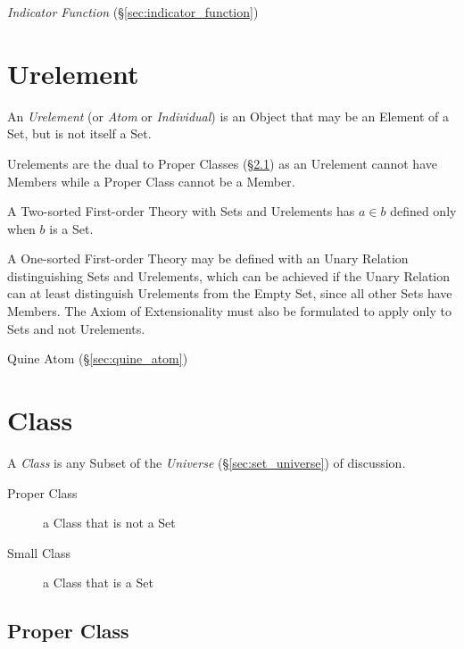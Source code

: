 \emph{Indicator Function} (\S\ref{sec:indicator_function})



\section{Urelement}\label{sec:urelement}

An \emph{Urelement} (or \emph{Atom} or \emph{Individual}) is an Object
that may be an Element of a Set, but is not itself a Set.

Urelements are the dual to Proper Classes (\S\ref{sec:proper_class})
as an Urelement cannot have Members while a Proper Class cannot be a
Member.

A Two-sorted First-order Theory with Sets and Urelements has $a \in b$
defined only when $b$ is a Set.

A One-sorted First-order Theory may be defined with an Unary Relation
distinguishing Sets and Urelements, which can be achieved if the Unary
Relation can at least distinguish Urelements from the Empty Set, since
all other Sets have Members. The Axiom of Extensionality must also be
formulated to apply only to Sets and not Urelements.

Quine Atom (\S\ref{sec:quine_atom})



\section{Class}\label{sec:class}

A \emph{Class} is any Subset of the \emph{Universe}
(\S\ref{sec:set_universe}) of discussion.

\begin{description}
  \item [Proper Class] a Class that is not a Set
  \item [Small Class] a Class that is a Set
\end{description}



\subsection{Proper Class}\label{sec:proper_class}

